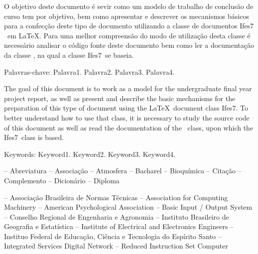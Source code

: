 \documentclass[times,english,brazil,oneside]{ifes7}
\newcommand{\ifestex}{\textsf{Ifes$7$}}
\begin{document}
\begin{resumo}
  O objetivo deste documento é sevir como um modelo de trabalho de
  conclusão de curso tem por objetivo, bem como apresentar e descrever
  os mecanismos básicos para a confecção deste tipo de documento
  utilizando a classe de documentos \ifestex\ em \LaTeX.
  Para uma melhor compreensão do modo de utilização desta classe é
  necessário analisar o código fonte deste documento bem como ler a
  documentação da classe \abnTeX, na qual a classe \ifestex\ se
  baseia.

  Palavras-chave: Palavra1. Palavra2. Palavra3. Palavra4.
\end{resumo}

\begin{resumo}[Abstract]
  \begin{otherlanguage}{english}
    The goal of this document is to work as a model for the
    undergraduate final year project report, as well as present and
    describe the basic mechanisms for the preparation of this type of
    document using the \LaTeX\ document class \ifestex.
    To better understand how to use that class, it is necessary to
    study the source code of this document as well as read the
    documentation of the \abnTeX\ class, upon which the \ifestex\
    class is based.

    Keywords: Keyword1. Keyword2. Keyword3. Keyword4.
  \end{otherlanguage}
\end{resumo}


\renewcommand{\listfigurename}{Lista de figuras}
\pdfbookmark[0]{\listfigurename}{lof}
\listoffigures*
\cleardoublepage


\listoftables*
\cleardoublepage


\listadequadros*
\cleardoublepage


\begin{abreviaturas}
   -- Abreviatura
   -- Associação
   -- Atmosfera
   -- Bacharel
   -- Bioquímica
   -- Citação
   -- Complemento
   -- Dicionário
   -- Diploma
\end{abreviaturas}


\begin{siglas}
   -- Associação Brasileira de Normas Técnicas
   -- Association for Computing Machinery
   -- American Psychological Association
   -- Basic Input / Output System
   -- Conselho Regional de Engenharia e Agronomia
   -- Instituto Brasileiro de Geografia e Estatística
  \simb{IEEE} -- Institute of Electrical and Electronics Engineers
  \simb{Ifes} -- Instituo Federal de Educação, Ciência e Tecnologia do Espírito Santo
  \simb{ISDN} -- Integrated Services Digital Network
   -- Reduced Instruction Set Computer
\end{siglas}
\end{document}
